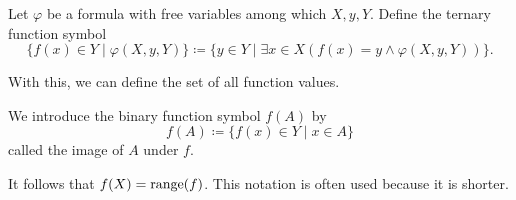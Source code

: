 \documentclass[../main.tex]{subfiles}
\begin{document}
\begin{definition}
    Let $\varphi$ be a formula with free variables among which $X,y,Y$.
    Define the ternary function symbol
    \begin{equation*}
        \{f(x)\in Y\mid\varphi(X,y,Y)\}\coloneq\{y\in Y\mid\exists x\in X(f(x)=y\land\varphi(X,y,Y))\}.
    \end{equation*}
\end{definition}
With this, we can define the set of all function values.
\begin{definition}
    We introduce the binary function symbol $f(A)$ by
    \begin{equation*}
        f(A)\coloneq\{f(x)\in Y\mid x\in A\}
    \end{equation*}
    called the image of $A$ under $f$.
\end{definition}
It follows that $f(X)=\operatorname{range}(f)$. This notation is often used because it is shorter.
\end{document}
